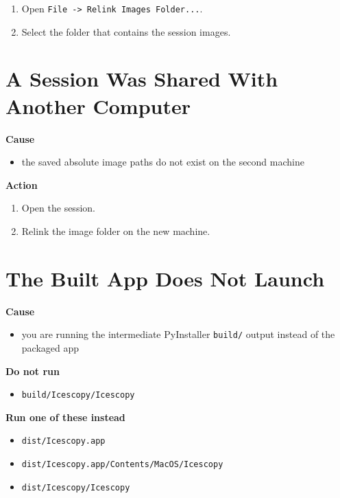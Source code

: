 \documentclass[
  9pt,
  letterpaper,
  oneside,
  open=any,
  DIV=15,
  parskip=half-,
  headings=big,
  numbers=noenddot
]{scrbook}
\newcommand{\manuallead}[1]{%
  \vspace{0.15em}%
  {\sffamily\bfseries\color{ManualBlue}#1}\par\nobreak\vspace{0.05em}%
}
\begin{document}
\begin{enumerate}[leftmargin=*,itemsep=0.35em,topsep=0.4em]
\item Open \texttt{File -> Relink Images Folder...}.
\item Select the folder that contains the session images.
\end{enumerate}

\section{A Session Was Shared With Another Computer}

\manuallead{Cause}

\begin{itemize}[leftmargin=*,itemsep=0.35em,topsep=0.4em]
\item the saved absolute image paths do not exist on the second machine
\end{itemize}

\manuallead{Action}

\begin{enumerate}[leftmargin=*,itemsep=0.35em,topsep=0.4em]
\item Open the session.
\item Relink the image folder on the new machine.
\end{enumerate}

\section{The Built App Does Not Launch}

\manuallead{Cause}

\begin{itemize}[leftmargin=*,itemsep=0.35em,topsep=0.4em]
\item you are running the intermediate PyInstaller \texttt{build/} output instead of the packaged app
\end{itemize}

\manuallead{Do not run}

\begin{itemize}[leftmargin=*,itemsep=0.35em,topsep=0.4em]
\item \texttt{build/Icescopy/Icescopy}
\end{itemize}

\manuallead{Run one of these instead}

\begin{itemize}[leftmargin=*,itemsep=0.35em,topsep=0.4em]
\item \texttt{dist/Icescopy.app}
\item \texttt{dist/Icescopy.app/Contents/MacOS/Icescopy}
\item \texttt{dist/Icescopy/Icescopy}
\end{itemize}
\end{document}
